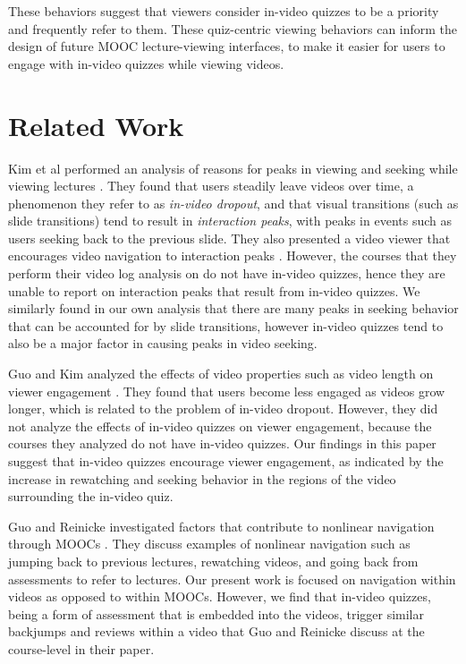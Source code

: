 \documentclass{sigchi}
\begin{document}
These behaviors suggest that viewers consider in-video quizzes to be a priority and frequently refer to them. These quiz-centric viewing behaviors can inform the design of future MOOC lecture-viewing interfaces, to make it easier for users to engage with in-video quizzes while viewing videos. %

\newpage

\section{Related Work}

Kim et al performed an analysis of reasons for peaks in viewing and seeking while viewing lectures \cite{juho}. They found that users steadily leave videos over time, a phenomenon they refer to as \emph{in-video dropout}, and that visual transitions (such as slide transitions) tend to result in \emph{interaction peaks}, with peaks in events such as users seeking back to the previous slide. They also presented a video viewer that encourages video navigation to interaction peaks  \cite{juho2}. However, the courses that they perform their video log analysis on do not have in-video quizzes, hence they are unable to report on interaction peaks that result from in-video quizzes. We similarly found in our own analysis that there are many peaks in seeking behavior that can be accounted for by slide transitions, however in-video quizzes tend to also be a major factor in causing peaks in video seeking.

Guo and Kim analyzed the effects of video properties such as video length on viewer engagement \cite{guovideo}. They found that users become less engaged as videos grow longer, which is related to the problem of in-video dropout. However, they did not analyze the effects of in-video quizzes on viewer engagement, because the courses they analyzed do not have in-video quizzes. Our findings in this paper suggest that in-video quizzes encourage viewer engagement, as indicated by the increase in rewatching and seeking behavior in the regions of the video surrounding the in-video quiz.

Guo and Reinicke investigated factors that contribute to nonlinear navigation through MOOCs \cite{guodemographics}. They discuss examples of nonlinear navigation such as jumping back to previous lectures, rewatching videos, and going back from assessments to refer to lectures. Our present work is focused on navigation within videos as opposed to within MOOCs. However, we find that in-video quizzes, being a form of assessment that is embedded into the videos, trigger similar backjumps and reviews within a video that Guo and Reinicke discuss at the course-level in their paper.
\end{document}
